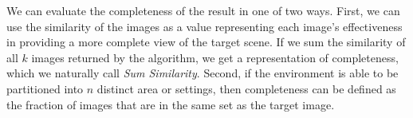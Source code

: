 We can evaluate the completeness of the result in one of two ways.  First, we can use the similarity of the images as a value representing each image's effectiveness in providing a more complete view of the target scene.  If we sum the similarity of all $k$ images returned by the algorithm, we get a representation of completeness, which we naturally call \emph{Sum Similarity}.  %
Second, if the environment is able to be partitioned into $n$ distinct area or settings, then completeness can be defined as the fraction of images that are in the same set as the target image.


